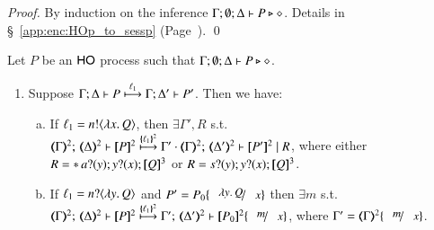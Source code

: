 \begin{proof}
	By induction on the inference $\Gamma; \emptyset; \Delta \proves P \hastype \Proc$. 
	Details in \S~\ref{app:enc:HOp_to_sessp}
	(Page~\pageref{app:enc:HOp_to_sessp}).
	\qed
\end{proof}

\begin{proposition}\rm
	Let $P$ be an  $\HO$ process such that  $\Gamma; \emptyset; \Delta \proves P \hastype \Proc$.
	
	\begin{enumerate}[1.]
	\item Suppose $\stytra{\Gamma}{\ell_1}{\Delta}{P}{\Delta'}{P'}$.
	Then we have:
	\begin{enumerate}[a)]
		\item	 
			If  $\ell_1 = \bactout{n}{\abs{x}Q}$,
			then $\exists \Gamma', R$ s.t. \\
			$\mapt{\Gamma}^{2};\, \mapt{\Delta}^{2} \proves  \map{P}^{2} 
			\hby{\mapa{\ell_1}^{2}}
			\Gamma' \cdot \mapt{\Gamma}^{2};\, \mapt{\Delta'}^{2} \proves \map{P'}^{2} \Par R$, 
			where either \\
			$R = \repl{} \binp{a}{y} \binp{y}{x} \pmap{Q}{3}$ 
			or $ R = \binp{s}{y} \binp{y}{x} \pmap{Q}{3}$.
		   


		\item	 
			If  %
			$\ell_1 = \bactinp{n}{\abs{y}Q}$
			and $P' = P_0\subst{\abs{y}Q}{x}$
			then $\exists m$ s.t. \\
			$\mapt{\Gamma}^{2};\, \mapt{\Delta}^{2} \proves \map{P}^{2} 
			\hby{\mapa{\ell_1}^{2}}
			\Gamma';\, \mapt{\Delta'}^{2} \proves  \map{P_0}^{2}\subst{m}{x}$, 
			where $\Gamma' = \mapt{\Gamma}^{2}\subst{m}{x}$.



\end{enumerate}
\end{enumerate}
\end{proposition}
